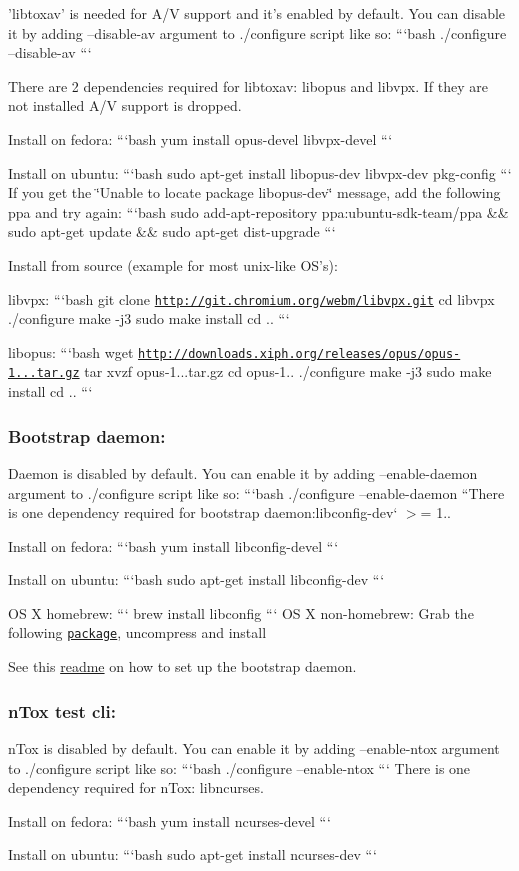'libtoxav' is needed for A/\+V support and it's enabled by default. You can disable it by adding --disable-\/av argument to ./configure script like so\+: ```bash ./configure --disable-\/av ```

There are 2 dependencies required for libtoxav\+: libopus and libvpx. If they are not installed A/\+V support is dropped.

Install on fedora\+: ```bash yum install opus-\/devel libvpx-\/devel ```

Install on ubuntu\+: ```bash sudo apt-\/get install libopus-\/dev libvpx-\/dev pkg-\/config ``` If you get the \char`\"{}\+Unable to locate package libopus-\/dev\char`\"{} message, add the following ppa and try again\+: ```bash sudo add-\/apt-\/repository ppa\+:ubuntu-\/sdk-\/team/ppa \&\& sudo apt-\/get update \&\& sudo apt-\/get dist-\/upgrade ```

Install from source (example for most unix-\/like O\+S's)\+:

libvpx\+: ```bash git clone \href{http://git.chromium.org/webm/libvpx.git}{\tt http\+://git.\+chromium.\+org/webm/libvpx.\+git} cd libvpx ./configure make -\/j3 sudo make install cd .. ```

libopus\+: ```bash wget \href{http://downloads.xiph.org/releases/opus/opus-1.0.3.tar.gz}{\tt http\+://downloads.\+xiph.\+org/releases/opus/opus-\/1...\+tar.\+gz} tar xvzf opus-\/1...\+tar.\+gz cd opus-\/1.. ./configure make -\/j3 sudo make install cd .. ```

\label{_bootstrapd}%
 \subsubsection*{Bootstrap daemon\+:}

Daemon is disabled by default. You can enable it by adding --enable-\/daemon argument to ./configure script like so\+: ```bash ./configure --enable-\/daemon ``{\ttfamily  There is one dependency required for bootstrap daemon\+:}libconfig-\/dev` $>$= 1..

Install on fedora\+: ```bash yum install libconfig-\/devel ```

Install on ubuntu\+: ```bash sudo apt-\/get install libconfig-\/dev ```

O\+S X homebrew\+: ``` brew install libconfig ``` O\+S X non-\/homebrew\+: Grab the following \href{http://www.hyperrealm.com/libconfig/}{\tt package}, uncompress and install

See this \hyperlink{md_other_bootstrap_daemon__r_e_a_d_m_e}{readme} on how to set up the bootstrap daemon.

\label{_ntox}%
 \subsubsection*{n\+Tox test cli\+:}

n\+Tox is disabled by default. You can enable it by adding --enable-\/ntox argument to ./configure script like so\+: ```bash ./configure --enable-\/ntox ``` There is one dependency required for n\+Tox\+: libncurses.

Install on fedora\+: ```bash yum install ncurses-\/devel ```

Install on ubuntu\+: ```bash sudo apt-\/get install ncurses-\/dev ``` 